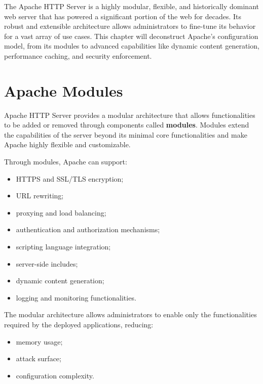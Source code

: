 \documentclass{scrbook}
\begin{document}
	The Apache HTTP Server is a highly modular, flexible, and historically dominant web server that has powered a significant portion of the web for decades. Its robust and extensible architecture allows administrators to fine-tune its behavior for a vast array of use cases. This chapter will deconstruct Apache's configuration model, from its modules to advanced capabilities like dynamic content generation, performance caching, and security enforcement.
	
	\section{Apache Modules}
	
	Apache HTTP Server provides a modular architecture that allows functionalities to be added or removed through components called \textbf{modules}. Modules extend the capabilities of the server beyond its minimal core functionalities and make Apache highly flexible and customizable.
	
	Through modules, Apache can support:
	\begin{itemize}
		\item HTTPS and SSL/TLS encryption;
		
		\item URL rewriting;
		
		\item proxying and load balancing;
		
		\item authentication and authorization mechanisms;
		
		\item scripting language integration;
		
		\item server-side includes;
		
		\item dynamic content generation;
		
		\item logging and monitoring functionalities.
	\end{itemize}
	
	The modular architecture allows administrators to enable only the functionalities required by the deployed applications, reducing:
	\begin{itemize}
		\item memory usage;
		
		\item attack surface;
		
		\item configuration complexity.
	\end{itemize}
	
\end{document}
